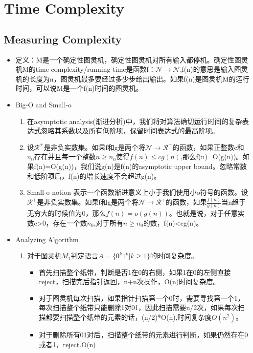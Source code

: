 \documentclass[UTF8]{ctexart}
\begin{document}
\section{Time Complexity}
\subsection{Measuring Complexity}
\begin{itemize}
    \item 定义：M是一个确定性图灵机，确定性图灵机对所有输入都停机。确定性图灵机M的time complexity/running time是函数f：$\mathcal{N}\to  \mathcal{N} $,f(n)的意思是输入图灵机的长度为n，图灵机最多要经过多少步给出输出。如果f(n)是图灵机M的运行时间，可以说M是一个f(n)时间的图灵机。
    \item Big-O and Small-o
    \begin{enumerate}
        \item 在asymptotic analysis(渐进分析)中，我们将对算法确切运行时间的复杂表达式忽略其系数以及所有低阶项，保留时间表达式的最高阶项。
        \item 设$\mathcal{R}^{+} $是非负实数集。如果f和g是两个将$\mathcal{N} \to \mathcal{R}^{+}$的函数，如果正整数c和$n_0$存在并且每一个整数$n\geqslant n_0$使得$f(n)\leqslant cg(n)$,那么f(n)=O(g(n))。如果f(n)=O(g(n))，我们说g(n)是f(n)的asymptotic upper bound。忽略常数和低阶项后，f(n)的增长速度不会超过g(n)。
        \item Small-o notion 表示一个函数渐进意义上小于我们使用小o符号的函数。设$\mathcal{R}^{+} $是非负实数集。如果f和g是两个将$\mathcal{N} \to \mathcal{R}^{+}$的函数，如果$\frac{f(n)}{g(n)}$当n趋于无穷大的时候值为0，那么$f(n)=o(g(n))$。也就是说，对于任意实数c>0，存在一个数$n_0$,对于所有$n\geqslant n_0$的数，f(n)<cg(n)。
    \end{enumerate}
    \item Analyzing Algorithm
    \begin{enumerate}
        \item 对于图灵机$M_1$判定语言$A=\{0^k1^k|k\geqslant 1\}$的时间复杂度。
        \begin{itemize}
            \item 首先扫描整个纸带，判断是否1在0的右侧，如果1在0的左侧直接reject，扫描完后指针返回，n+n次操作，O(n)时间复杂度。
            \item 对于图灵机每次扫描，如果指针扫描第一个0时，需要寻找第一个1，每次扫描整个纸带只能删除1对01，因此扫描需要n/2次，如果每次扫描都要扫描整个纸带的元素的话，(n/2)*O(n),时间复杂度$O(n^2)$。
            \item 对于删除所有01对后，扫描整个纸带的元素进行判断，如果仍然存在0或者1，reject.O(n)

\end{itemize}
\end{enumerate}
\end{itemize}
\end{document}
